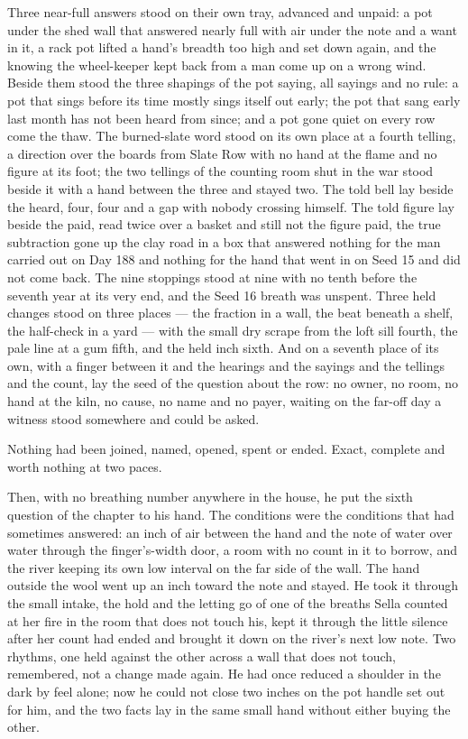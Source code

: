 Three near-full answers stood on their own tray, advanced and unpaid: a pot under the shed wall that answered nearly full with air under the note and a want in it, a rack pot lifted a hand's breadth too high and set down again, and the knowing the wheel-keeper kept back from a man come up on a wrong wind. Beside them stood the three shapings of the pot saying, all sayings and no rule: a pot that sings before its time mostly sings itself out early; the pot that sang early last month has not been heard from since; and a pot gone quiet on every row come the thaw. The burned-slate word stood on its own place at a fourth telling, a direction over the boards from Slate Row with no hand at the flame and no figure at its foot; the two tellings of the counting room shut in the war stood beside it with a hand between the three and stayed two. The told bell lay beside the heard, four, four and a gap with nobody crossing himself. The told figure lay beside the paid, read twice over a basket and still not the figure paid, the true subtraction gone up the clay road in a box that answered nothing for the man carried out on Day 188 and nothing for the hand that went in on Seed 15 and did not come back. The nine stoppings stood at nine with no tenth before the seventh year at its very end, and the Seed 16 breath was unspent. Three held changes stood on three places --- the fraction in a wall, the beat beneath a shelf, the half-check in a yard --- with the small dry scrape from the loft sill fourth, the pale line at a gum fifth, and the held inch sixth. And on a seventh place of its own, with a finger between it and the hearings and the sayings and the tellings and the count, lay the seed of the question about the row: no owner, no room, no hand at the kiln, no cause, no name and no payer, waiting on the far-off day a witness stood somewhere and could be asked.

Nothing had been joined, named, opened, spent or ended. Exact, complete and worth nothing at two paces.

Then, with no breathing number anywhere in the house, he put the sixth question of the chapter to his hand. The conditions were the conditions that had sometimes answered: an inch of air between the hand and the note of water over water through the finger's-width door, a room with no count in it to borrow, and the river keeping its own low interval on the far side of the wall. The hand outside the wool went up an inch toward the note and stayed. He took it through the small intake, the hold and the letting go of one of the breaths Sella counted at her fire in the room that does not touch his, kept it through the little silence after her count had ended and brought it down on the river's next low note. Two rhythms, one held against the other across a wall that does not touch, remembered, not a change made again. He had once reduced a shoulder in the dark by feel alone; now he could not close two inches on the pot handle set out for him, and the two facts lay in the same small hand without either buying the other.

